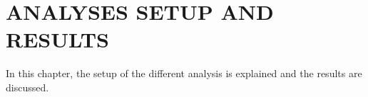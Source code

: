 \chapter{ANALYSES SETUP AND RESULTS}
\normalsize{In this chapter, the setup of the different analysis is explained and the results are discussed.}




